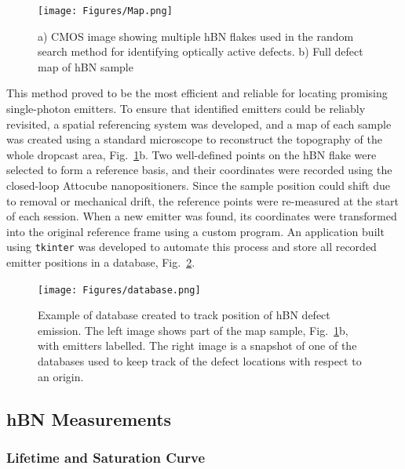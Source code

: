\begin{figure}[h]
    \centering
    \texttt{[image: Figures/Map.png]}
    \caption{a) CMOS image showing multiple hBN flakes used in the random search method for identifying optically active defects. b) Full defect map of hBN sample}
    \label{fig:map}
\end{figure}


This method proved to be the most efficient and reliable for locating promising single-photon emitters. To ensure that identified emitters could be reliably revisited, a spatial referencing system was developed, and a map of each sample was created using a standard microscope to reconstruct the topography of the whole dropcast area, Fig.~\ref{fig:map}b. Two well-defined points on the hBN flake were selected to form a reference basis, and their coordinates were recorded using the closed-loop Attocube nanopositioners. Since the sample position could shift due to removal or mechanical drift, the reference points were re-measured at the start of each session. When a new emitter was found, its coordinates were transformed into the original reference frame using a custom program. An application built using \texttt{tkinter} was developed to automate this process and store all recorded emitter positions in a database, Fig.~\ref{fig:database}.

\begin{figure}
    \centering
    \texttt{[image: Figures/database.png]}
    \caption{Example of database created to track position of hBN defect emission. The left image shows part of the map sample, Fig.~\ref{fig:map}b, with emitters labelled. The right image is a snapshot of one of the databases used to keep track of the defect locations with respect to an origin.}
    \label{fig:database}
\end{figure}


\subsection{hBN Measurements}

\subsubsection{Lifetime and Saturation Curve}

